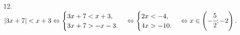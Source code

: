 12. $|3x+7|<x+3\Leftrightarrow\begin{cases}3x+7<x+3,\\ 3x+7>-x-3.\end{cases}
\Leftrightarrow\begin{cases}2x<-4,\\ 4x>-10.\end{cases}\Leftrightarrow x\in \left(-\cfrac{5}{2};-2\right).$\newpage\noindent
